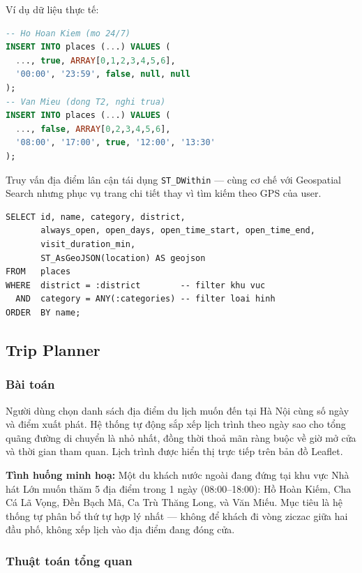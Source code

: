 \documentclass[12pt,a4paper]{article}
\begin{document}
Ví dụ dữ liệu thực tế:

\begin{lstlisting}[language=SQL]
-- Ho Hoan Kiem (mo 24/7)
INSERT INTO places (...) VALUES (
  ..., true, ARRAY[0,1,2,3,4,5,6],
  '00:00', '23:59', false, null, null
);
-- Van Mieu (dong T2, nghi trua)
INSERT INTO places (...) VALUES (
  ..., false, ARRAY[0,2,3,4,5,6],
  '08:00', '17:00', true, '12:00', '13:30'
);
\end{lstlisting}

Truy vấn địa điểm lân cận tái dụng \texttt{ST\_DWithin} --- cùng cơ chế với
Geospatial Search nhưng phục vụ trang chi tiết thay vì tìm kiếm theo GPS
của user.

\begin{lstlisting}
SELECT id, name, category, district,
       always_open, open_days, open_time_start, open_time_end,
       visit_duration_min,
       ST_AsGeoJSON(location) AS geojson
FROM   places
WHERE  district = :district        -- filter khu vuc
  AND  category = ANY(:categories) -- filter loai hinh
ORDER  BY name;
\end{lstlisting}

\subsection{Trip Planner}

\subsubsection{Bài toán}

Người dùng chọn danh sách địa điểm du lịch muốn đến tại Hà Nội cùng số ngày
và điểm xuất phát. Hệ thống tự động sắp xếp lịch trình theo ngày sao cho tổng
quãng đường di chuyển là nhỏ nhất, đồng thời thoả mãn ràng buộc về giờ mở cửa
và thời gian tham quan. Lịch trình được hiển thị trực tiếp trên bản đồ Leaflet.

\medskip
\textbf{Tình huống minh hoạ:} Một du khách nước ngoài đang đứng tại khu vực
Nhà hát Lớn muốn thăm 5 địa điểm trong 1 ngày (08:00--18:00): Hồ Hoàn Kiếm,
Cha Cá Lã Vọng, Đền Bạch Mã, Ca Trù Thăng Long, và Văn Miếu. Mục tiêu là hệ
thống tự phân bổ thứ tự hợp lý nhất --- không để khách đi vòng ziczac giữa hai
đầu phố, không xếp lịch vào địa điểm đang đóng cửa.

\subsubsection{Thuật toán tổng quan}
\end{document}

